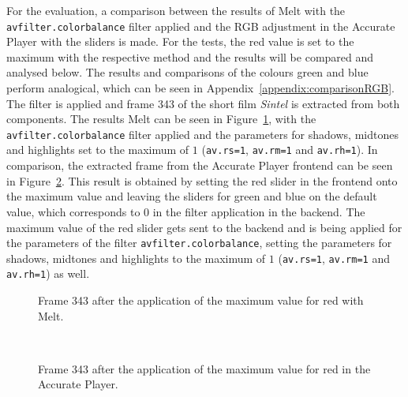 \documentclass[../MasterThesis.tex]{subfiles}
\begin{document}
For the evaluation, a comparison between the results of Melt with the \texttt{avfilter.colorbalance} filter applied and the RGB adjustment in the Accurate Player with the sliders is made.
For the tests, the red value is set to the maximum with the respective method and the results will be compared and analysed below. The results and comparisons of the colours green and blue perform analogical, which can be seen in Appendix~\ref{appendix:comparisonRGB}.
The filter is applied and frame 343 of the short film \textit{Sintel} is extracted from both components. The results Melt can be seen in Figure~\ref{figure:redMelt}, with the \texttt{avfilter.colorbalance} filter applied and the parameters for shadows, midtones and highlights set to the maximum of $1$ (\texttt{av.rs=1}, \texttt{av.rm=1} and \texttt{av.rh=1}).
In comparison, the extracted frame from the Accurate Player frontend can be seen in Figure~\ref{figure:redAP}. This result is obtained by setting the red slider in the frontend onto the maximum value and leaving the sliders for green and blue on the default value, which corresponds to $0$ in the filter application in the backend. The maximum value of the red slider gets sent to the backend and is being applied for the parameters of the filter \texttt{avfilter.colorbalance}, setting the parameters for shadows, midtones and highlights to the maximum of $1$ (\texttt{av.rs=1}, \texttt{av.rm=1} and \texttt{av.rh=1}) as well.



\begin{minipage}{0.48\textwidth}
	\begin{figure}[H]
		\begin{center}
			\caption[Frame 343 after the application of the red filter with Melt.]{Frame 343 after the application of the maximum value for red with Melt.}
			\label{figure:redMelt}
		\end{center}
	\end{figure}
\end{minipage}\begin{minipage}{0.04\textwidth}
	\ 
\end{minipage}\begin{minipage}{0.48\textwidth}
	\begin{figure}[H]
		\begin{center}
			\caption[Frame 343 after the application of the red filter in the Accurate Player.]{Frame 343 after the application of the maximum value for red in the Accurate Player.}
			\label{figure:redAP}
		\end{center}
	\end{figure}
\end{minipage}
\end{document}

